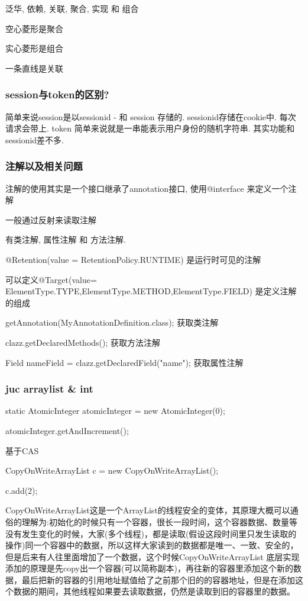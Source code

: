 泛华, 依赖, 关联, 聚合, 实现 和 组合

空心菱形是聚合

实心菱形是组合

一条直线是关联


\subsubsection{session与token的区别?}
简单来说session是以sessionid - 和 session 存储的. sessionid存储在cookie中. 每次请求会带上.
token 简单来说就是一串能表示用户身份的随机字符串. 其实功能和sessionid差不多.
\subsubsection{注解以及相关问题}
注解的使用其实是一个接口继承了annotation接口, 使用@interface 来定义一个注解

一般通过反射来读取注解

有类注解, 属性注解 和 方法注解.

@Retention(value = RetentionPolicy.RUNTIME) 是运行时可见的注解

可以定义@Target(value= {ElementType.TYPE,ElementType.METHOD,ElementType.FIELD})  是定义注解的组成

getAnnotation(MyAnnotationDefinition.class); 获取类注解

clazz.getDeclaredMethods(); 获取方法注解

Field nameField =  clazz.getDeclaredField("name"); 获取属性注解


\subsubsection{juc arraylist \& int}
static AtomicInteger atomicInteger = new AtomicInteger(0);

atomicInteger.getAndIncrement();

基于CAS

CopyOnWriteArrayList c = new CopyOnWriteArrayList();

c.add(2);

CopyOnWriteArrayList这是一个ArrayList的线程安全的变体，其原理大概可以通俗的理解为:初始化的时候只有一个容器，很长一段时间，这个容器数据、数量等没有发生变化的时候，大家(多个线程)，都是读取(假设这段时间里只发生读取的操作)同一个容器中的数据，所以这样大家读到的数据都是唯一、一致、安全的，但是后来有人往里面增加了一个数据，这个时候CopyOnWriteArrayList 底层实现添加的原理是先copy出一个容器(可以简称副本)，再往新的容器里添加这个新的数据，最后把新的容器的引用地址赋值给了之前那个旧的的容器地址，但是在添加这个数据的期间，其他线程如果要去读取数据，仍然是读取到旧的容器里的数据。

